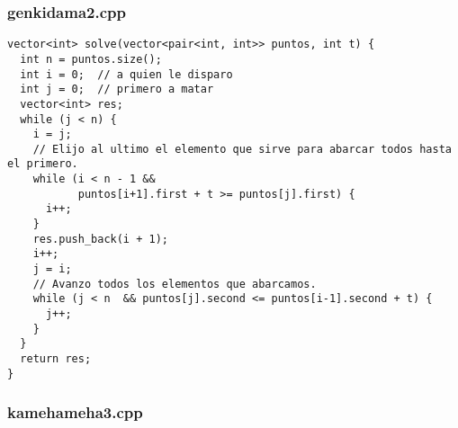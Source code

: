 \subsubsection{genkidama2.cpp}

\begin{lstlisting}[frame=single]
vector<int> solve(vector<pair<int, int>> puntos, int t) {
  int n = puntos.size();
  int i = 0;  // a quien le disparo
  int j = 0;  // primero a matar
  vector<int> res;
  while (j < n) {
    i = j;    
    // Elijo al ultimo el elemento que sirve para abarcar todos hasta el primero.
    while (i < n - 1 &&
           puntos[i+1].first + t >= puntos[j].first) {
      i++;
    }
    res.push_back(i + 1);
    i++;
    j = i;
    // Avanzo todos los elementos que abarcamos.
    while (j < n  && puntos[j].second <= puntos[i-1].second + t) {
      j++;
    }
  }
  return res;
}
\end{lstlisting}

\subsubsection{kamehameha3.cpp}

